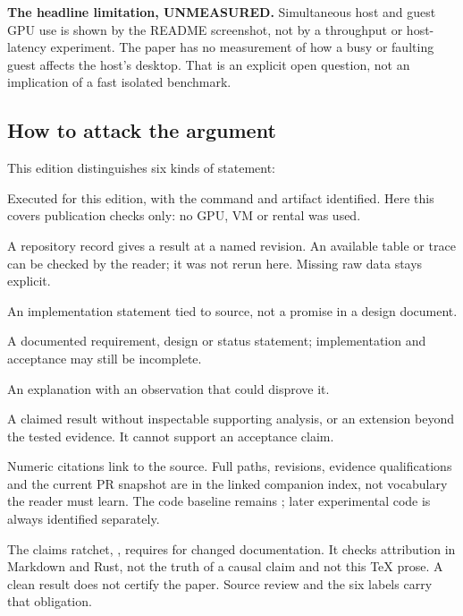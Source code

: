 \textbf{The headline limitation, UNMEASURED.} Simultaneous host and guest GPU use is shown by
the README screenshot, not by a throughput or host-latency experiment. The paper has no
measurement of how a busy or faulting guest affects the host's desktop. That is an explicit
open question, not an implication of a fast isolated benchmark.

\subsection{How to attack the argument}

This edition distinguishes six kinds of statement:

\begin{description}[itemsep=0.35em]
\item[MEASURED] Executed for this edition, with the command and artifact identified. Here this
  covers publication checks only: no GPU, VM or rental was used.
\item[REPORTED] A repository record gives a result at a named revision. An available table or
  trace can be checked by the reader; it was not rerun here. Missing raw data stays explicit.
\item[CODE] An implementation statement tied to source, not a promise in a design document.
\item[DOC] A documented requirement, design or status statement; implementation and acceptance
  may still be incomplete.
\item[INFERRED] An explanation with an observation that could disprove it.
\item[UNVERIFIED] A claimed result without inspectable supporting analysis, or an extension
  beyond the tested evidence. It cannot support an acceptance claim.
\end{description}

Numeric citations link to the source. Full paths, revisions, evidence qualifications and the
current PR snapshot are in the linked companion index, not vocabulary the reader must learn.
The code baseline remains ; later experimental
code is always identified separately.

\doc The claims ratchet, , requires  for
changed documentation. It checks attribution in Markdown and Rust, not the truth of a causal
claim and not this TeX prose. A clean result does not certify the paper. Source review and the
six labels carry that obligation.

